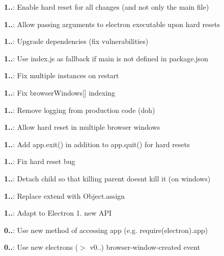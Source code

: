 \begin{DoxyItemize}
\item {\bfseries 1..}\+: Enable hard reset for all changes (and not only the main file)
\item {\bfseries 1..}\+: Allow passing arguments to electron executable upon hard resets
\item {\bfseries 1..}\+: Upgrade dependencies (fix vulnerabilities)
\item {\bfseries 1..}\+: Use {\ttfamily index.\+js} as fallback if {\ttfamily main} is not defined in {\ttfamily package.\+json}
\item {\bfseries 1..}\+: Fix multiple instances on restart
\item {\bfseries 1..}\+: Fix {\ttfamily browser\+Windows\mbox{[}\mbox{]}} indexing
\item {\bfseries 1..}\+: Remove logging from production code (d\textquotesingle{}oh)
\item {\bfseries 1..}\+: Allow hard reset in multiple browser windows
\item {\bfseries 1..}\+: Add {\ttfamily app.\+exit()} in addition to {\ttfamily app.\+quit()} for hard resets
\item {\bfseries 1..}\+: Fix hard reset bug
\item {\bfseries 1..}\+: Detach child so that killing parent doesn\textquotesingle{}t kill it (on windows)
\item {\bfseries 1..}\+: Replace {\ttfamily extend} with {\ttfamily Object.\+assign}
\item {\bfseries 1..}\+: Adapt to Electron 1. new A\+PI
\item {\bfseries 0..}\+: Use new method of accessing {\ttfamily app} (e.\+g. {\ttfamily require(electron).app})
\item {\bfseries 0..}\+: Use new electrons ($>$ v0..) {\ttfamily browser-\/window-\/created} event 
\end{DoxyItemize}